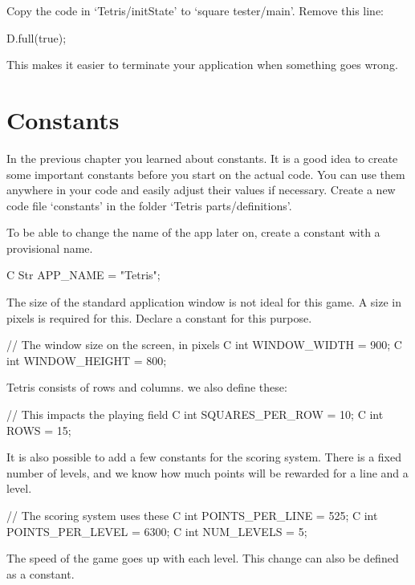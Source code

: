 Copy the code in `Tetris/initState' to `square tester/main'. Remove this line: 
	
\begin{code}
D.full(true);
\end{code}

This makes it easier to terminate your application when something goes wrong.	

\section{Constants}
In the previous chapter you learned about constants. It is a good idea to create some important constants before you start on the actual code. You can use them anywhere in your code and easily adjust their values if necessary. Create a new code file `constants' in the folder `Tetris parts/definitions'.

To be able to change the name of the app later on, create a constant  with a provisional name.

\begin{code}
C Str APP_NAME = "Tetris";
\end{code}

The size of the standard application window is not ideal for this game. A size in pixels is required for this. Declare a constant  for this purpose.

\begin{code}
// The window size on the screen, in pixels
C int WINDOW_WIDTH  = 900;
C int WINDOW_HEIGHT = 800;
\end{code}

Tetris consists of rows and columns. we also define these:

\begin{code}
// This impacts the playing field
C int SQUARES_PER_ROW = 10;
C int ROWS            = 15;
\end{code}

It is also possible to add a few constants for the scoring system. There is a fixed number of levels, and we know how much points will be rewarded for a line and a level.

\begin{code}
// The scoring system uses these
C int POINTS_PER_LINE  =  525;
C int POINTS_PER_LEVEL = 6300;
C int NUM_LEVELS       =    5;
\end{code}

The speed of the game goes up with each level. This change can also be defined as a constant.

